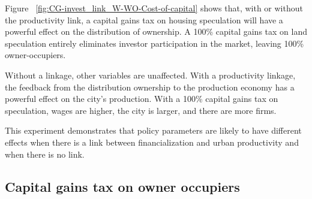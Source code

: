 {Figure ~\ref{fig:CG-invest_link_W-WO-Cost-of-capital} shows that, with or without the productivity link, a capital gains tax on housing speculation will have a powerful effect on the distribution of ownership. A 100\% capital gains tax on land speculation entirely eliminates investor participation in the market, leaving 100\%  owner-occupiers. 

Without a linkage, other variables are unaffected. With a productivity linkage, the feedback from the distribution ownership to the production economy has a powerful effect on the city's production. With a 100\% capital gains tax on speculation, wages are  higher, the city is larger, and there are more firms. 

 This experiment demonstrates that policy parameters are likely to have different effects when there is a link between financialization and urban productivity and when there is no link.

 
\newpage
\subsection{Capital gains tax on owner occupiers}

}
